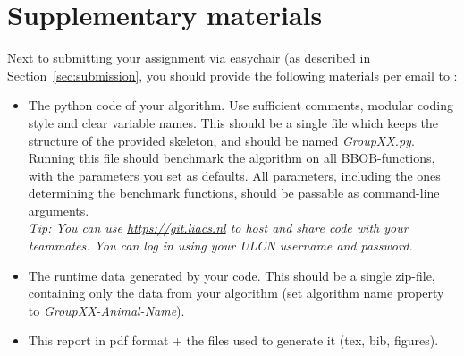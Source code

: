 \documentclass[runningheads]{llncs}
\begin{document}
\section{Supplementary materials}
Next to submitting your assignment via easychair (as described in Section~\ref{sec:submission}, you should provide the following materials per email to \href{mailto:NACO-TA@liacs.leidenuniv.nl}{}: \begin{itemize}
    \item The python code of your algorithm. Use sufficient comments, modular coding style and clear variable names. This should be a single file which keeps the structure of the provided skeleton, and should be named \textit{GroupXX.py}. Running this file should benchmark the algorithm on all BBOB-functions, with the parameters you set as defaults. All parameters, including the ones determining the benchmark functions, should be passable as command-line arguments.\\
    \textit{Tip: You can use \url{https://git.liacs.nl} to host and share code with your teammates. You can log in using your ULCN username and password.}
    \item The runtime data generated by your code. This should be a single zip-file, containing only the data from your algorithm (set algorithm name property to \textit{GroupXX-Animal-Name}).
    \item This report in pdf format + the files used to generate it (tex, bib, figures). 
\end{itemize}
\end{document}
